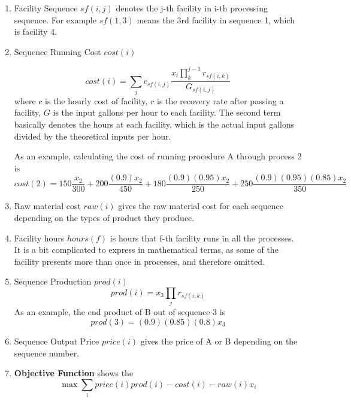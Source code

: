 \begin{enumerate}
\item Facility Sequence $sf(i, j)$ denotes the j-th facility in i-th processing sequence. For example $sf(1, 3)$ means the 3rd facility in sequence 1, which is facility 4. 
\item Sequence Running Cost $cost(i)$\par
$$
cost(i) = \sum_j c_{sf(i, j)} \frac{x_i \prod_k^{j-1} r_{sf(i, k)}}{G_{sf(i,j)}}
$$
where $c$ is the hourly cost of facility, $r$ is the recovery rate after passing a facility, $G$ is the input gallons per hour to each facility. The second term basically denotes the hours at each facility, which is the actual input gallons divided by the theoretical inputs per hour. 

As an example, calculating the cost of running procedure A through process 2 is
$$
cost(2) = 150\frac{x_2}{300} + 200 \frac{(0.9)x_2}{450} + 180\frac{(0.9)(0.95)x_2}{250} + 250 \frac{(0.9)(0.95)(0.85)x_2}{350}
$$
\item Raw material cost $raw(i)$ gives the raw material cost for each sequence depending on the types of product they produce. 
\item Facility hours $hours(f)$ is hours that f-th facility runs in all the processes. It is a bit complicated to express in mathematical terms, as some of the facility presents more than once in processes, and therefore omitted. 
\item Sequence Production $prod(i)$
$$
prod(i) = x_3\prod_j r_{sf(i, k)}
$$
As an example, the end product of B out of sequence 3 is
$$
prod(3) = (0.9)(0.85)(0.8)x_3
$$
\item Sequence Output Price $price(i)$ gives the price of A or B depending on the sequence number. 
\item \textbf{Objective Function} shows the 
$$
\max \sum_i price(i) prod(i) - cost(i) - raw(i)x_i
$$
\end{enumerate}

